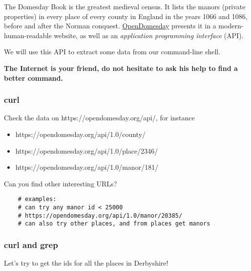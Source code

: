 The Domesday Book is the greatest medieval census.
It lists the manors (private properties) in every place of every county in England in the years 1066 and 1086, before and after the Norman conquest.
\href{https://opendomesday.org/}{OpenDomesday} presents it in a modern-human-readable website, as well as an {\it application programming interface} (API).

We will use this API to extract some data from our command-line shell.

{\bf The Internet is your friend, do not hesitate to ask his help to find a better command.}

\subsubsection{curl}

Check the data on https://opendomesday.org/api/, for instance

\begin{itemize}
    \item https://opendomesday.org/api/1.0/county/
    \item https://opendomesday.org/api/1.0/place/2346/
    \item https://opendomesday.org/api/1.0/manor/181/
\end{itemize}

Can you find other interesting URLs?

\ifdefined\answer
\begin{verbatim}
    # examples:
    # can try any manor id < 25000
    # https://opendomesday.org/api/1.0/manor/20385/
    # can also try other places, and from places get manors
\end{verbatim}
\fi

\subsubsection{curl and grep}

Let's try to get the ids for all the places in Derbyshire!

\ifdefined\answer
\inputminted[firstline=1,lastline=7]{bash}{TD1_Linux_shell_answers.sh}
\fi

